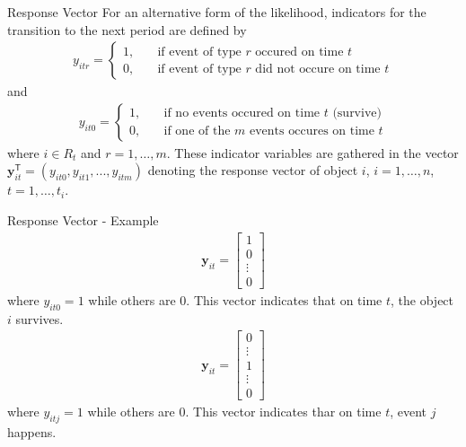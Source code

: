 \documentclass{beamer}
\begin{document}
    \begin{frame}{Response Vector}
         For an alternative form of the likelihood, indicators for the transition to the
         next period are defined by
         \begin{align}
         y_{itr} = \begin{cases}
         1, &\quad \text{if event of type }r\text{ occured on time }t \\
         0, &\quad \text{if event of type }r\text{ did not occure on time }t
         \end{cases}
         \end{align}
         and
         \begin{align}
         y_{it0} = \begin{cases}
         1, &\quad \text{if no events occured on time }t \text{ (survive)} \\
         0, &\quad \text{if one of the } m\text{ events occures on time }t
         \end{cases}
         \end{align}
         where $i \in R_t$ and $r=1,\dots,m$. These indicator variables are gathered in the vector $\mathbf{y}_{it}^\mathsf{T}  = (y_{it0},y_{it1},...,y_{itm})$ denoting the response vector of object $i$, $i = 1,\dots,n$, $t = 1,\dots,t_i$.
    \end{frame}
    
     \begin{frame}{Response Vector - Example}
         \begin{align*}
         \mathbf{y}_{it} = \begin{bmatrix}
         1 \\ 0 \\ \vdots \\ 0
         \end{bmatrix}
         \end{align*}
         where $y_{it0} = 1$ while others are $0$. This vector indicates that on time $t$, the object $i$ survives.
         \begin{align*}
         \mathbf{y}_{it} = \begin{bmatrix}
         0 \\ \vdots\\1\\ \vdots \\ 0
         \end{bmatrix}
         \end{align*}
         where $y_{itj} = 1$ while others are $0$. This vector indicates thar on time $t$, event $j$ happens.
     \end{frame}
     
\end{document}
